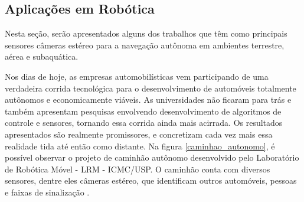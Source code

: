 


\subsection{Aplicações em Robótica}
\label{aplicacoes_robotica}
Nesta seção, serão apresentados alguns dos trabalhos que têm como principais sensores câmeras estéreo para a navegação autônoma em ambientes terrestre, aérea e subaquática.

Nos dias de hoje, as empresas automobilísticas vem participando de uma verdadeira corrida tecnológica para o desenvolvimento de automóveis totalmente autônomos e economicamente viáveis. As universidades não ficaram para trás e também apresentam pesquisas envolvendo desenvolvimento de algoritmos de controle e sensores, tornando essa corrida ainda mais acirrada. Os resultados apresentados são realmente promissores, e concretizam cada vez mais essa realidade tida até então como distante. Na figura \ref{caminhao_autonomo}, é possível observar o projeto de caminhão autônomo desenvolvido pelo Laboratório de Robótica Móvel - LRM - ICMC/USP. O caminhão conta com diversos sensores, dentre eles câmeras estéreo, que identificam outros automóveis, pessoas e faixas de sinalização \cite{ShinzatoP}. 


